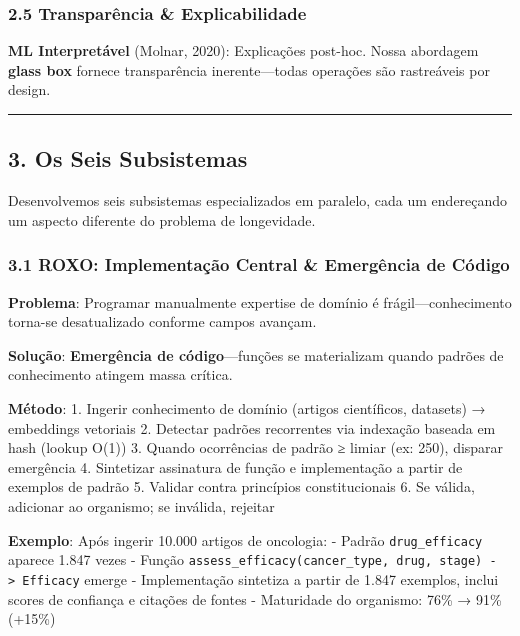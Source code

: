 \documentclass[
]{article}
\begin{document}
\subsubsection{2.5 Transparência \&
Explicabilidade}\label{transparuxeancia-explicabilidade}

\textbf{ML Interpretável} (Molnar, 2020): Explicações post-hoc. Nossa
abordagem \textbf{glass box} fornece transparência inerente---todas
operações são rastreáveis por design.

\begin{center}\rule{0.5\linewidth}{0.5pt}\end{center}

\subsection{3. Os Seis Subsistemas}\label{os-seis-subsistemas}

Desenvolvemos seis subsistemas especializados em paralelo, cada um
endereçando um aspecto diferente do problema de longevidade.

\subsubsection{3.1 ROXO: Implementação Central \& Emergência de
Código}\label{roxo-implementauxe7uxe3o-central-emerguxeancia-de-cuxf3digo}

\textbf{Problema}: Programar manualmente expertise de domínio é
frágil---conhecimento torna-se desatualizado conforme campos avançam.

\textbf{Solução}: \textbf{Emergência de código}---funções se
materializam quando padrões de conhecimento atingem massa crítica.

\textbf{Método}: 1. Ingerir conhecimento de domínio (artigos
científicos, datasets) → embeddings vetoriais 2. Detectar padrões
recorrentes via indexação baseada em hash (lookup O(1)) 3. Quando
ocorrências de padrão ≥ limiar (ex: 250), disparar emergência 4.
Sintetizar assinatura de função e implementação a partir de exemplos de
padrão 5. Validar contra princípios constitucionais 6. Se válida,
adicionar ao organismo; se inválida, rejeitar

\textbf{Exemplo}: Após ingerir 10.000 artigos de oncologia: - Padrão
\texttt{drug\_efficacy} aparece 1.847 vezes - Função
\texttt{assess\_efficacy(cancer\_type,\ drug,\ stage)\ -\textgreater{}\ Efficacy}
emerge - Implementação sintetiza a partir de 1.847 exemplos, inclui
scores de confiança e citações de fontes - Maturidade do organismo: 76\%
→ 91\% (+15\%)
\end{document}
